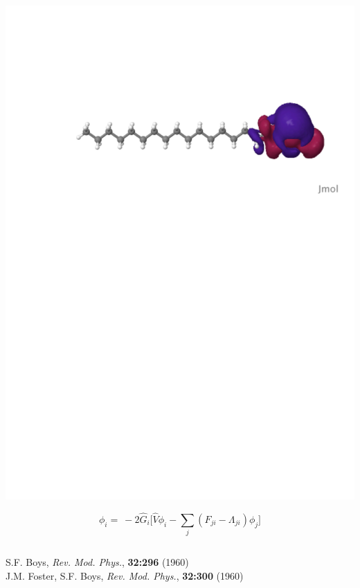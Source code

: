 \documentclass[mathserif, 10pt]{beamer}
\begin{document}
\begin{frame}
\begin{columns}
\begin{column}[b]{0.48\linewidth}
{    \includegraphics[scale=0.25, clip, viewport = 80 560 600 700]{figures/loc_orb_3.pdf}\\

    \vspace{2mm}

    \begin{equation}
        \nonumber
        \phi_i =\ -2\hat{G}_i\Bigg[\hat{V}\phi_i
        - \sum_j(F_{ji} - \Lambda_{ji})\phi_j\Bigg]
    \end{equation}
}
    \end{column}
    \end{columns}

    \vspace{6mm}

    \centering
    \tiny
    S.F. Boys,
    {\it Rev. Mod. Phys.}, 
    \textbf{32:296}
    (1960)\\
    J.M. Foster, S.F. Boys,
    {\it Rev. Mod. Phys.}, 
    \textbf{32:300}
    (1960)
\end{frame}
\end{document}
